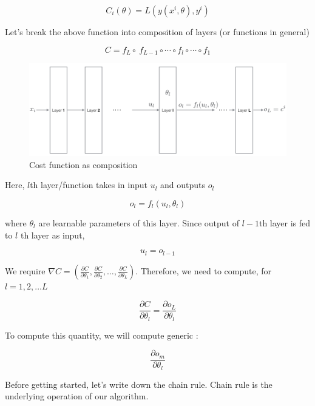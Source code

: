 \documentclass[a4paper]{tufte-handout}
\begin{document}
\[ C_i(\theta) = L\left(y(x^i, \theta), y^i \right)\]

Let's break the above function into composition of layers (or functions
in general)

\[ C = f_L \circ \ f_{L-1} \circ \cdots \circ f_l \circ \cdots \circ f_1 \]

\begin{figure}
  \includegraphics[width=\linewidth]{backprop.png}
  \caption{Cost function as composition}
\end{figure}


Here, \(l\)th  layer/function takes in input
\(u_l\) and outputs \(o_l\)

\begin{equation}
o_l = f_l(u_l, \theta_l) \label{eq:1}
\end{equation}


where \(\theta_l\) are learnable parameters of this layer. Since output
of \(l-1\)th layer is fed to \(l\) th layer as input,


\begin{equation}
u_l = o_{l-1} \label{eq:2}
\end{equation}


We require
\(\nabla C = \left(\frac{\partial C}{\partial\theta_1}, \frac{\partial C}{\partial\theta_2}, \ldots, \frac{\partial C}{\partial\theta_L}\right)\).
Therefore, we need to compute, for  \( l = 1, 2, \dots L \)

\[ \frac{\partial C}{\partial\theta_l} = \frac{\partial o_L}{\partial\theta_l} \]


To compute this quantity, we will compute generic
:

\[ \frac{\partial o_m}{\partial \theta_l} \]

Before getting started, let's write down the chain rule. Chain rule is
the underlying operation of our algorithm.
\end{document}
